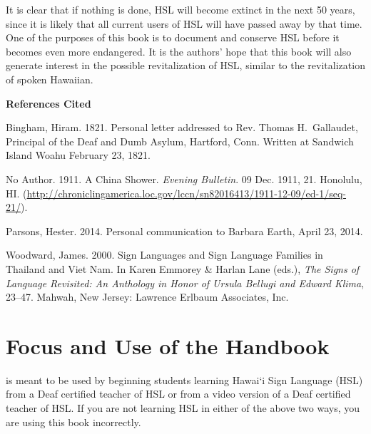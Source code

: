 \documentclass{tufte-book}
\begin{document}
It is clear that if nothing is done, HSL will become extinct in the next 50 years, since it is likely that all current users of HSL will have passed away by that time. One of the purposes of this book is to document and conserve HSL before it becomes even more endangered. It is the authors' hope that this book will also generate interest in the possible revitalization of HSL, similar to the revitalization of spoken Hawaiian.

\begin{center}
\textbf{References Cited}
\end{center}

 Bingham, Hiram. 1821. Personal letter addressed to Rev. Thomas H.~Gallaudet, Principal of the
Deaf and Dumb Asylum, Hartford, Conn. Written at Sandwich Island Woahu February 23, 1821.

No Author. 1911. A China Shower. \emph{Evening Bulletin}. 09 Dec. 1911, 21. Honolulu, HI. (\href{http://chroniclingamerica.loc.gov/lccn/sn82016413/1911-12-09/ed-1/seq-21/}{http://chroniclingamerica.loc.gov/lccn/sn82016413/1911-12-09/ed-1/seq-21/}).

Parsons, Hester. 2014. Personal communication to Barbara Earth, April 23, 2014.

Woodward, James. 2000. Sign Languages and Sign Language Families in Thailand
and Viet Nam. In Karen Emmorey \& Harlan Lane (eds.), \emph{The Signs of Language Revisited: An Anthology in Honor of Ursula Bellugi and Edward Klima}, 23–47. Mahwah, New Jersey: Lawrence Erlbaum Associates, Inc.

\chapter{Focus and Use of the Handbook}

 is meant to be used by beginning students learning Hawai`i Sign Language (HSL) from a Deaf certified teacher of HSL or from a video version of a Deaf certified teacher of HSL. If you are not learning HSL in either of the above two ways, you are using this book incorrectly.
\end{document}
